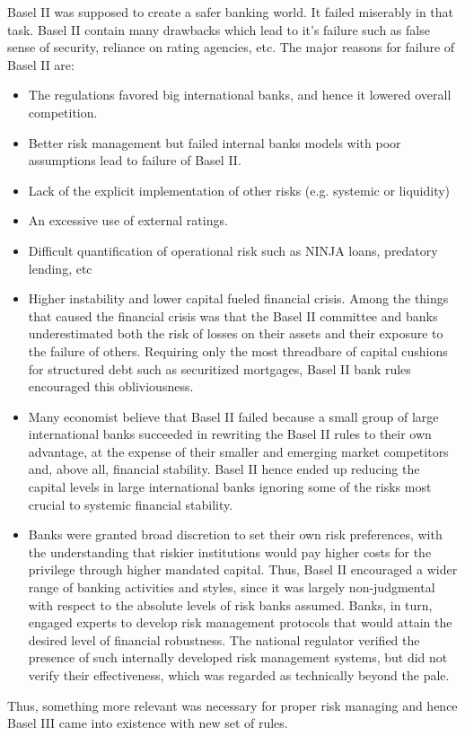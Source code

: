 \documentclass[11pt]{article}
\numberwithin{equation}{section}
\begin{document}
Basel II was supposed to create a safer banking world. It failed miserably in that task. Basel II contain many drawbacks which lead to it's failure such as false sense of security, reliance on rating agencies, etc. The major reasons for failure of Basel II are:
\begin{itemize}

\item The regulations favored big international banks, and hence it lowered overall competition.

\item Better risk management but failed internal banks models with poor assumptions lead to failure of Basel II.

\item Lack of the explicit implementation of other risks (e.g. systemic or liquidity)

\item An excessive use of external ratings.

\item Difficult quantification of operational risk such as NINJA loans, predatory lending, etc

\item Higher instability and lower capital fueled financial crisis. Among the things that caused the financial crisis was that the Basel II committee and banks underestimated both the risk of losses on their assets and their exposure to the failure of others.  Requiring only the most threadbare of capital cushions for structured debt such as securitized mortgages, Basel II bank rules encouraged this obliviousness. 

\item Many economist believe that Basel II failed because a small group of large international banks succeeded in rewriting the Basel II rules to their own advantage, at the expense of their smaller and emerging market competitors and, above all, financial stability. Basel II hence ended up reducing the capital levels in large international banks ignoring some of the risks most crucial to systemic financial stability.


\item Banks were granted broad discretion to set their own risk preferences, with the understanding that riskier institutions would pay higher costs for the privilege through higher mandated capital. Thus, Basel II encouraged a wider range of banking activities and styles, since it was largely non-judgmental with respect to the absolute levels of risk banks assumed. Banks, in turn, engaged experts to develop risk management protocols that would attain the desired level of financial robustness. The national regulator verified the presence of such internally developed risk management systems, but did not verify their effectiveness, which was regarded as technically beyond the pale.

\end{itemize} 
Thus, something more relevant was necessary for proper risk managing and hence Basel III came into existence with new set of rules. 
\end{document}
